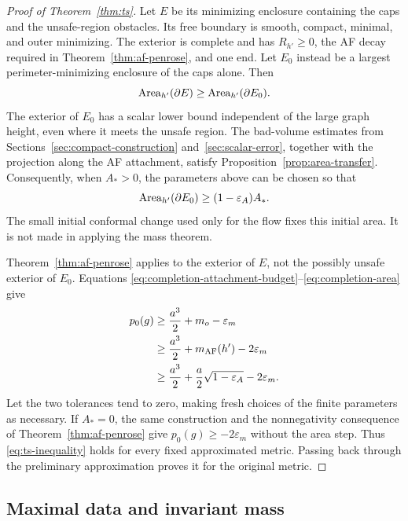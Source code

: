 \begin{proof}[Proof of Theorem~\ref{thm:ts}]
Let $E$ be its minimizing enclosure containing the caps and the
unsafe-region obstacles. Its free boundary is smooth, compact,
minimal, and outer minimizing. The exterior is complete and has
$R_{h'}\ge0$, the AF decay required in Theorem~\ref{thm:af-penrose},
and one end. Let $E_0$ instead be a largest perimeter-minimizing
enclosure of the caps alone. Then
\begin{equation}\label{eq:completion-enclosure-order}
 \operatorname{Area}_{h'}(\partial E)\ge\operatorname{Area}_{h'}(\partial E_0).
\end{equation}
The exterior of $E_0$ has a scalar lower bound independent of the
large graph height, even where it meets the unsafe region.
The bad-volume estimates from Sections~\ref{sec:compact-construction}
and~\ref{sec:scalar-error}, together with the projection along the
AF attachment, satisfy Proposition~\ref{prop:area-transfer}.
Consequently, when $A_*>0$, the parameters above can be chosen so that
\begin{equation}\label{eq:completion-area}
 \operatorname{Area}_{h'}(\partial E_0)\ge(1-\varepsilon_A)A_*.
\end{equation}
The small initial conformal change used only for the flow fixes this
initial area. It is not made in applying the mass theorem.

Theorem~\ref{thm:af-penrose} applies to the exterior of $E$, not the
possibly unsafe exterior of $E_0$. Equations
\eqref{eq:completion-attachment-budget}--\eqref{eq:completion-area}
give
\begin{align*}
 p_0(g)
 &\ge \frac{a^3}{2}+m_o-\varepsilon_m\\
 &\ge \frac{a^3}{2}+m_{\mathrm{AF}}(h')-2\varepsilon_m\\
 &\ge \frac{a^3}{2}+\frac a2\sqrt{1-\varepsilon_A}
                         -2\varepsilon_m.
\end{align*}
Let the two tolerances tend to zero, making fresh choices of the
finite parameters as necessary. If $A_*=0$, the same construction
and the nonnegativity consequence of Theorem~\ref{thm:af-penrose}
give $p_0(g)\ge-2\varepsilon_m$ without the area step.
Thus \eqref{eq:ts-inequality} holds for every fixed approximated
metric. Passing back through the preliminary approximation proves
it for the original metric.
\end{proof}

\subsection{Maximal data and invariant mass}

